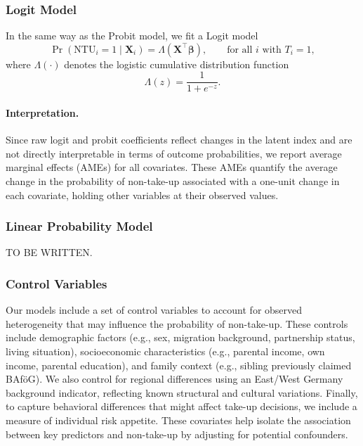 \subsubsection{Logit Model}
In the same way as the Probit model, we fit a Logit model
\begin{equation}
  \Pr(\mathrm{NTU}_i = 1 \mid \mathbf{X}_i) = \Lambda(\mathbf{X}^\top \boldsymbol{\beta})
  , \qquad \text{for all } i \text{ with } T_i = 1,
\end{equation}
where \( \Lambda(\cdot) \) denotes the logistic cumulative distribution function
\begin{equation}
  \Lambda(z) = \frac{1}{1 + e^{-z}}.
\end{equation}

\paragraph{Interpretation.} %
Since raw logit and probit coefficients reflect changes in the latent index and are not directly interpretable in terms of outcome probabilities, we report average marginal effects (AMEs) for all covariates. These AMEs quantify the average change in the probability of non-take-up associated with a one-unit change in each covariate, holding other variables at their observed values.


\subsubsection{Linear Probability Model}
TO BE WRITTEN.

\subsubsection{Control Variables}
Our models include a set of control variables to account for observed heterogeneity that may influence the probability of non-take-up. 
These controls include demographic factors (e.g., sex, migration background, partnership status, living situation), socioeconomic characteristics (e.g., parental income, own income, parental education), and family context (e.g., sibling previously claimed BAföG). 
We also control for regional differences using an East/West Germany background indicator, reflecting known structural and cultural variations. 
Finally, to capture behavioral differences that might affect take-up decisions, we include a measure of individual risk appetite. 
These covariates help isolate the association between key predictors and non-take-up by adjusting for potential confounders.

